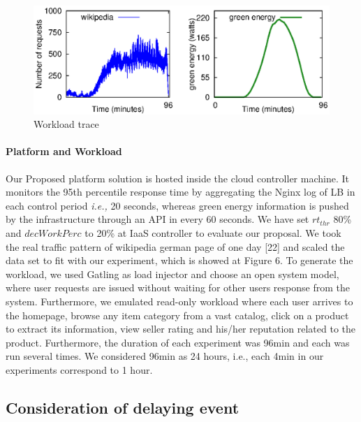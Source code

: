 \begin{figure}[h]
\includegraphics[scale=.75]{Graphs/workload_ucc.eps}
\caption{Workload trace}
\label{fig:workload} 
\end{figure}

\paragraph*{\textbf{Platform and Workload}} Our Proposed platform solution is hosted inside the cloud controller
machine. It monitors the 95th percentile response
time by aggregating the Nginx log of LB in each control period \emph{i.e.,} 20 seconds, whereas green energy
information is pushed by the infrastructure through an API in every 60 seconds. We have set $rt_{thr}$ 80\% and $decWorkPerc$ to 20\% at IaaS controller to evaluate our proposal.
We took the real traffic pattern of wikipedia german page of one day [22] and scaled the data set to fit with our experiment,
which is showed at Figure 6. To generate the workload, we used Gatling as load injector and choose an
open system model, where user requests are issued without
waiting for other users response from the system. Furthermore,
we emulated read-only workload where each user arrives to the homepage, browse any item category from a
vast catalog, click on a product to extract its information,
view seller rating and his/her reputation related to the
product. Furthermore, the duration
of each experiment was 96min and each was run several
times. We considered 96min as 24 hours, i.e., each 4min in
our experiments correspond to 1 hour.


\subsection{Consideration of delaying event}

